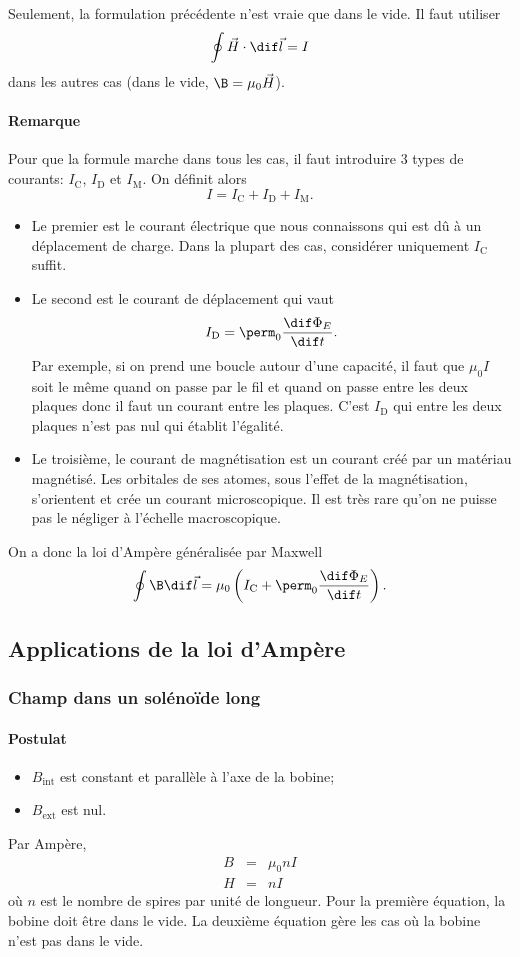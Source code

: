 Seulement, la formulation précédente n'est vraie que dans le vide.
Il faut utiliser
\[ \oint \vec H \cdot \dif \vec l = I \]
dans les autres cas (dans le vide, $\B = \mu_0 \vec H$).

\paragraph{Remarque}
Pour que la formule marche dans tous les cas,
il faut introduire 3 types de courants:
$I_\mathrm{C}$, $I_\mathrm{D}$ et $I_\mathrm{M}$.
On définit alors
\[ I = I_\mathrm{C} + I_\mathrm{D} + I_\mathrm{M}. \]

\begin{itemize}
  \item Le premier est le courant électrique
    que nous connaissons qui est dû à un déplacement de charge.
    Dans la plupart des cas, considérer uniquement $I_\mathrm{C}$ suffit.
  \item Le second est le courant de déplacement qui vaut
    \[ I_\mathrm{D} = \perm_0\frac{\dif \Phi_E}{\dif t}. \]
    Par exemple, si on prend une boucle autour d'une capacité,
    il faut que $\mu_0I$ soit le même quand on passe par le fil et quand
    on passe entre les deux plaques donc il faut un courant entre les plaques.
    C'est $I_\mathrm{D}$ qui entre les deux plaques
    n'est pas nul qui établit l'égalité.
  \item Le troisième,
    le courant de magnétisation est un courant créé par un matériau magnétisé.
    Les orbitales de ses atomes, sous l'effet de la magnétisation,
    s'orientent et crée un courant microscopique.
    Il est très rare qu'on ne puisse pas le négliger à l'échelle macroscopique.
\end{itemize}
On a donc la loi d'Ampère généralisée par Maxwell
\[ \oint \B \dif \vec l =
\mu_0 \left(I_\mathrm{C} + \perm_0 \frac{\dif \Phi_E}{\dif t}\right). \]

\subsection{Applications de la loi d'Ampère}
\subsubsection{Champ dans un solénoïde long}
\label{sec:bbl}
\paragraph{Postulat}
\begin{itemize}
  \item $B_\mathrm{int}$ est constant et parallèle à l'axe de la bobine;
  \item $B_\mathrm{ext}$ est nul.
\end{itemize}
Par Ampère,
\begin{eqnarray*}
  B &=& \mu_0nI\\
  H &=& nI
\end{eqnarray*}
où $n$ est le nombre de spires par unité de longueur.
Pour la première équation, la bobine doit être dans le vide.
La deuxième équation gère les cas où la bobine n'est pas dans le vide.


